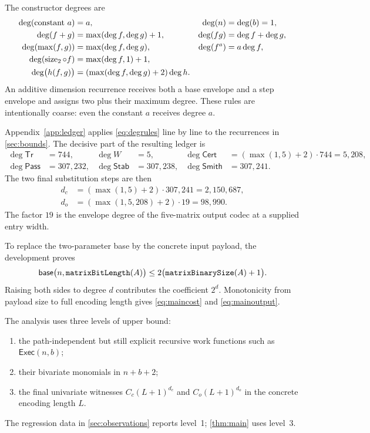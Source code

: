 \documentclass[11pt]{article}
\theoremstyle{definition}
\newcommand{\natsize}{\operatorname{size}_2}
\newcommand{\code}[1]{\texttt{\detokenize{#1}}}
\newcommand{\mcode}[1]{\text{\ttfamily\detokenize{#1}}}
\begin{document}
The constructor degrees are
\begin{align}
 \deg(\text{constant }a)&=a, & \deg(n)&=\deg(b)=1,\notag\\
 \deg(f+g)&=\max(\deg f,\deg g)+1,
 &\deg(fg)&=\deg f+\deg g,\label{eq:degrules}\\
 \deg(\max(f,g))&=\max(\deg f,\deg g),
 &\deg(f^a)&=a\deg f,\notag\\
 \deg(\natsize\circ f)&=\max(\deg f,1)+1,\notag\\
 \deg\bigl(h(f,g)\bigr)&=(\max(\deg f,\deg g)+2)\deg h.\notag
\end{align}
An additive dimension recurrence receives both a base envelope and a step envelope and assigns two plus their maximum degree.  These rules are intentionally coarse: even the constant $a$ receives degree $a$.

Appendix~\ref{app:ledger} applies \eqref{eq:degrules} line by line to the recurrences in \cref{sec:bounds}.  The decisive part of the resulting ledger is
\begin{align*}
 \deg \mathsf{Tr}&=744, &
 \deg W&=5, &
 \deg \mathsf{Cert}&=(\max(1,5)+2)\cdot744=5{,}208,\\
 \deg \mathsf{Pass}&=307{,}232, &
 \deg \mathsf{Stab}&=307{,}238, &
 \deg \mathsf{Smith}&=307{,}241.
\end{align*}
The two final substitution steps are then
\begin{align}
 d_c&=(\max(1,5)+2)\cdot307{,}241
      =2{,}150{,}687,\label{eq:costdegreecalc}\\
 d_o&=(\max(1,5{,}208)+2)\cdot19
      =98{,}990.\label{eq:outputdegreecalc}
\end{align}
The factor $19$ is the envelope degree of the five-matrix output codec at a supplied entry width.

To replace the two-parameter base by the concrete input payload, the development proves
\[
 \mathsf{base}\bigl(n,\mcode{matrixBitLength}(A)\bigr)
   \le 2\bigl(\mcode{matrixBinarySize}(A)+1\bigr).
\]
Raising both sides to degree $d$ contributes the coefficient $2^d$.  Monotonicity from payload size to full encoding length gives \eqref{eq:maincost} and \eqref{eq:mainoutput}.

The analysis uses three levels of upper bound:
\begin{enumerate}
  \item the path-independent but still explicit recursive work functions such as $\mathsf{Exec}(n,b)$;
  \item their bivariate \code{PolyEnvelope} monomials in $n+b+2$;
  \item the final univariate witnesses $C_c(L+1)^{d_c}$ and $C_o(L+1)^{d_o}$ in the concrete encoding length $L$.
\end{enumerate}
The regression data in \cref{sec:observations} reports level~1; \cref{thm:main} uses level~3.
\end{document}
